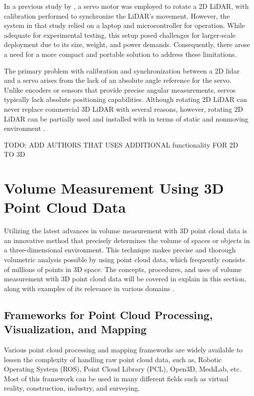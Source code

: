 In a previous study by \citet{clar2022}, a servo motor was employed to rotate a 2D LiDAR, with calibration performed to synchronize the LiDAR's movement. However, the system in that study relied on a laptop and microcontroller for operation. While adequate for experimental testing, this setup posed challenges for larger-scale deployment due to its size, weight, and power demands. Consequently, there arose a need for a more compact and portable solution to address these limitations.

The primary problem with calibration and synchronization between a 2D lidar and a servo arises from the lack of an absolute angle reference for the servo. Unlike encoders or sensors that provide precise angular measurements, servos typically lack absolute positioning capabilities. Although rotating 2D LiDAR can never replace commercial 3D LiDAR with several reasons, however, rotating 2D LiDAR can be partially used and installed with in terms of static and nonmoving environment \citep{bi2021}.

TODO: ADD AUTHORS THAT USES ADDITIONAL functionality FOR 2D TO 3D

\section{Volume Measurement Using 3D Point Cloud Data}

Utilizing the latest advances in volume measurement with 3D point cloud data is an innovative method that precisely determines the volume of spaces or objects in a three-dimensional environment. This technique makes precise and thorough volumetric analysis possible by using point cloud data, which frequently consists of millions of points in 3D space. The concepts, procedures, and uses of volume measurement with 3D point cloud data will be covered in explain in this section, along with examples of its relevance in various domains \citep{zhi2016,meng2023}.

\subsection{Frameworks for Point Cloud Processing, Visualization, and Mapping}
Various point cloud processing and mapping frameworks are widely available to lessen the complexity of handling raw point cloud data, such as, Robotic Operating System (ROS), Point Cloud Library (PCL), Open3D, MeshLab, etc. Most of this framework can be used in many different fields such as virtual reality, construction, industry, and surveying.

